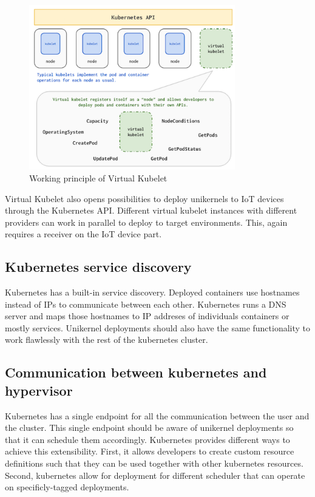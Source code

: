 \begin{figure}[htpb]
  \centering
  \includegraphics[width=0.8\textwidth]{figures/vk.png}
  \caption{Working principle of Virtual Kubelet \cite{virtual}} \label{fig:vk}
\end{figure}

Virtual Kubelet also opens possibilities to deploy unikernels to IoT devices through the Kubernetes API. Different virtual kubelet instances with different providers can work in parallel to deploy to target environments. This, again requires a receiver on the IoT device part. 
\subsection{Kubernetes service discovery}
Kubernetes has a built-in service discovery. Deployed containers use hostnames instead of IPs to communicate between each other. Kubernetes runs a DNS server and maps those hostnames to IP addreses of individuals containers or mostly services. Unikernel deployments should also have the same functionality to work flawlessly with the rest of the kubernetes cluster. 

\subsection{Communication between kubernetes and hypervisor}
Kubernetes has a single endpoint for all the communication between the user and the cluster. This single endpoint should be aware of unikernel deployments so that it can schedule them accordingly. Kubernetes provides different ways to achieve this extensibility. First, it allows developers to create custom resource definitions such that they can be used together with other kubernetes resources. Second, kubernetes allow for deployment for different scheduler that can operate on specificly-tagged deployments. 


